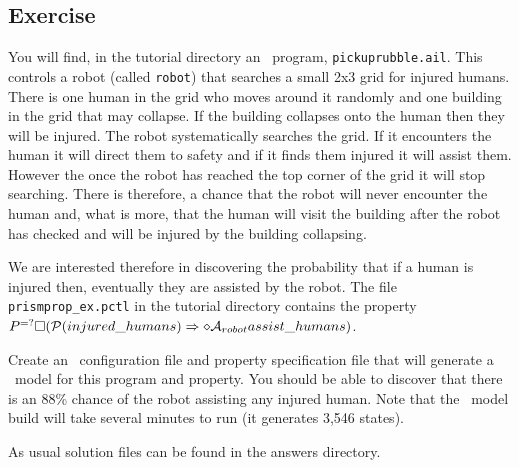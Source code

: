 \documentclass[a4]{article}
\begin{document}
\subsection{Exercise}

You will find, in the tutorial directory an \ail\ program, \texttt{pickuprubble.ail}.  This controls a robot (called \texttt{robot}) that searches a small 2x3 grid for injured humans.  There is one human in the grid who moves around it randomly and one building in the grid that may collapse.  If the building collapses onto the human then they will be injured.  The robot systematically searches the grid.  If it encounters the human it will direct them to safety and if it finds them injured it will assist them.  However the once the robot has reached the top corner of the grid it will stop searching.  There is therefore, a chance that the robot will never encounter the human and, what is more, that the human will visit the building after the robot has checked and will be injured by the building collapsing.

\begin{sloppypar}
We are interested therefore in discovering the probability that if a human is injured then, eventually they are assisted by the robot.  The file \texttt{prismprop\_ex.pctl} in the tutorial directory contains the property $P^{=?}\Box (\mathrm{{\cal P}}(injured\_humans) \Rightarrow  \diamond \mathrm{{\cal A}}_{robot} assist\_humans)$.  
\end{sloppypar}

Create an \ajpf\ configuration file and property specification file that will generate a \prism\ model for this program and property.  You should be able to discover that there is an 88\% chance of the robot assisting any injured human.  Note that the \ajpf\ model build will take several minutes to run (it generates 3,546 states).

As usual solution files can be found in the answers directory.

\end{document}
